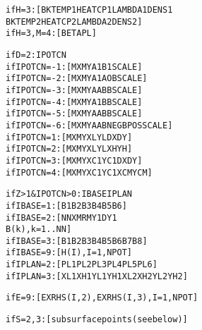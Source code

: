 \documentclass[12pt]{report}
\renewcommand{\magenta}[1]{}
\begin{document}
\begin{alltt}
% Material parameters for temperature calculation (section \ref{sec:matcns}):

if H=3:      [ BKTEMP1  HEATCP1  LAMBDA1  DENS1           
               BKTEMP2  HEATCP2  LAMBDA2  DENS2 ]
if H=3, M=4: [ BETAPL                           ]

% Information needed for the grid discretization (section \ref{sec:pot_con}).
% Hertzian options when IPOTCN<0 (sections \ref{sec:hertz3d}, \ref{sec:hertz2d}, \ref{sec:sdec}), direct
% specification of potential contact area when IPOTCN>0 (section \ref{sec:nonhzvar}).

if D=2: IPOTCN
      if IPOTCN=-1: [ MX  MY  A1  B1   SCALE ]
      if IPOTCN=-2: [ MX  MY  A1  AOB  SCALE ]
      if IPOTCN=-3: [ MX  MY  AA  BB   SCALE ]
      if IPOTCN=-4: [ MX  MY  A1  BB   SCALE ]
      if IPOTCN=-5: [ MX  MY  AA  BB   SCALE ]
      if IPOTCN=-6: [ MX  MY  AA  BNEG BPOS SCALE ]
      if IPOTCN= 1: [ MX  MY  XL  YL   DX   DY  ]
      if IPOTCN= 2: [ MX  MY  XL  YL   XH   YH  ]
      if IPOTCN= 3: [ MX  MY  XC1 YC1  DX   DY  ]
      if IPOTCN= 4: [ MX  MY  XC1 YC1  XCM  YCM ]

% Information for the undeformed distance calculation, when not using
% a Hertzian option above (section \ref{sec:ibase}):

if Z>1 & IPOTCN>0: IBASE   IPLAN
      if IBASE= 1:  [ B1   B2   B3   B4   B5   B6            ]
      if IBASE= 2:  [ NN   XM   RM   Y1   DY1
                      B(k), k=1..NN                          ]
      if IBASE= 3:  [ B1   B2   B3   B4   B5   B6   B7   B8  ]
      if IBASE= 9:  [ H(I), I=1,NPOT                         ]
      if IPLAN= 2:  [ PL1  PL2  PL3  PL4  PL5  PL6           ]
      if IPLAN= 3:  [ XL1  XH1  YL1  YH1  XL2  XH2  YL2  YH2 ]
\magenta{      if IPLAN= 4:  [ NPATCH
                      YSEP(I),  I=1,NPATCH-1
                     (FAC(I,J), J=I+1,NPATCH), I=1,NPATCH-1  ]
}
\magenta{% Variable friction per grid row IY (section \ref{sec:varfrc}):

if VARFRC=2:
      if L=0: [ FSTAT  FKIN                                ], MY times
      if L=2: [ FKIN   FLIN1  SABSH1  FLIN2  SABSH2        ], MY times
      if L=3: [ FKIN   FRAT1  SABSH1  FRAT2  SABSH2        ], MY times
      if L=4: [ FKIN   FEXP1  SABSH1  FEXP2  SABSH2        ], MY times
      if L=6: [ FREF   TREF   DFHEAT  DTHEAT               ], MY times
      if L=2,3,4,6: [ MEMDST MEM\_S0                        ]
}

% Kinematics, extra terms to tangential right hand side (section \ref{sec:kincns}):

if E=9: [ EXRHS(I,2), EXRHS(I,3), I=1,NPOT    ]

% Subsurface stress calculation (section \ref{sec:subsurf}):

if S=2,3: [ subsurface points (see below) ]
\end{alltt}
\end{document}
